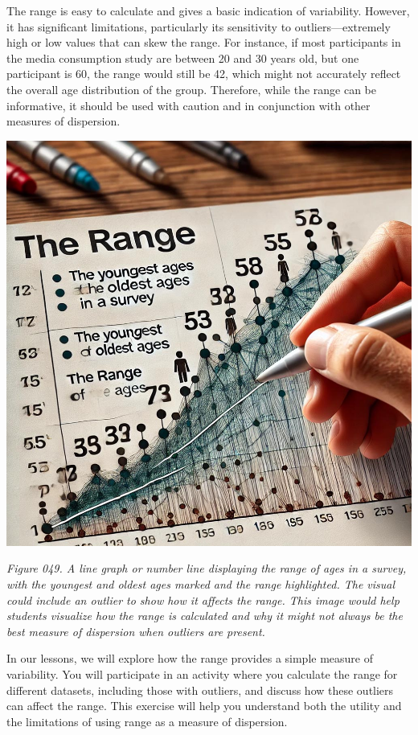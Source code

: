 \documentclass[
]{book}
\begin{document}
The range is easy to calculate and gives a basic indication of variability. However, it has significant limitations, particularly its sensitivity to outliers---extremely high or low values that can skew the range. For instance, if most participants in the media consumption study are between 20 and 30 years old, but one participant is 60, the range would still be 42, which might not accurately reflect the overall age distribution of the group. Therefore, while the range can be informative, it should be used with caution and in conjunction with other measures of dispersion.

\includegraphics[width=1\textwidth,height=\textheight]{images/fig049.jpg}

\emph{Figure 049. A line graph or number line displaying the range of ages in a survey, with the youngest and oldest ages marked and the range highlighted. The visual could include an outlier to show how it affects the range. This image would help students visualize how the range is calculated and why it might not always be the best measure of dispersion when outliers are present.}

In our lessons, we will explore how the range provides a simple measure of variability. You will participate in an activity where you calculate the range for different datasets, including those with outliers, and discuss how these outliers can affect the range. This exercise will help you understand both the utility and the limitations of using range as a measure of dispersion.
\end{document}
